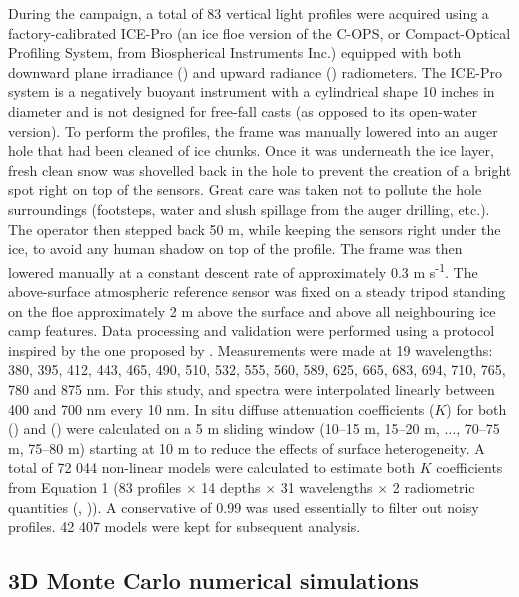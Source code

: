 During the campaign, a total of 83 vertical light profiles were acquired using a factory-calibrated ICE-Pro (an ice floe version of the C-OPS, or Compact-Optical Profiling System, from Biospherical Instruments Inc.) equipped with both downward plane irradiance \edz{} (\wmsquare{}) and upward radiance \luz{} (\wmsquaresr{}) radiometers. The ICE-Pro system is a negatively buoyant instrument with a cylindrical shape 10 inches in diameter and is not designed for free-fall casts (as opposed to its open-water version). To perform the profiles, the frame was manually lowered into an auger hole that had been cleaned of ice chunks. Once it was underneath the ice layer, fresh clean snow was shovelled back in the hole to prevent the creation of a bright spot right on top of the sensors. Great care was taken not to pollute the hole surroundings (footsteps, water and slush spillage from the auger drilling, etc.). The operator then stepped back 50 m, while keeping the sensors right under the ice, to avoid any human shadow on top of the profile. The frame was then lowered manually at a constant descent rate of approximately 0.3 m s\textsuperscript{-1}. The above-surface atmospheric reference sensor was fixed on a steady tripod standing on the floe approximately 2 m above the surface and above all neighbouring ice camp features. Data processing and validation were performed using a protocol inspired by the one proposed by \citet{Smith1984}\DIFdelbegin {}\DIFdelend . Measurements were made at 19 wavelengths: 380, 395, 412, 443, 465, 490, 510, 532, 555, 560, 589, 625, 665, 683, 694, 710, 765, 780 and 875 nm. For this study, \ed{} and \lu{} spectra were interpolated linearly between 400 and 700 nm every 10 nm. In situ diffuse attenuation coefficients ($K$) for both \ed{} (\ked{}) and \lu{} (\klu{}) were calculated on a 5 m sliding window (10--15 m, 15--20 m, $\ldots$, 70--75 m, 75--80 m) starting at 10 m \DIFaddbegin {}\DIFaddend to reduce the effects of surface heterogeneity. A total of 72 044 non-linear models were calculated to estimate both $K$ coefficients from Equation 1 (83 profiles $\times$ 14 depths $\times$ 31 wavelengths $\times$ 2 radiometric quantities (\ed{}, \lu{})). A conservative \rsquared{} of 0.99 was used essentially to filter out noisy profiles. 42 407 models were kept for subsequent analysis.

\subsection{3D Monte Carlo numerical simulations \DIFaddbegin {}\DIFaddend }

